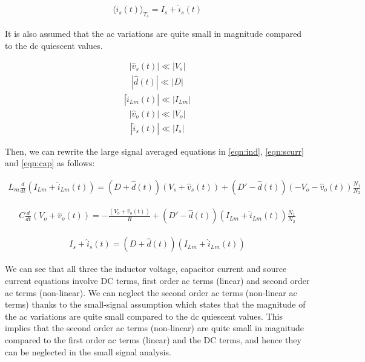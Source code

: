 \begin{align}
     \langle i_s(t) \rangle_{T_s} = I_s + \hat{i}_s(t)
\end{align}

It is also assumed that the ac variations are quite small in magnitude compared to the dc quiescent values.

\begin{align}
    |\hat{v}_s(t)| \ll |V_s|
\end{align}
\begin{align}
    |\hat{d}(t)| \ll |D|
\end{align}
\begin{align}
    |\hat{i}_{Lm}(t)| \ll |I_{Lm}|
\end{align}
\begin{align}
    |\hat{v}_o(t)| \ll |V_o|
\end{align}
\begin{align}
    |\hat{i}_s(t)| \ll |I_s|
\end{align}

Then, we can rewrite the large signal averaged equations in \eqref{eqn:ind}, \eqref{eqn:scurr} and \eqref{eqn:cap} as follows:

\begin{align}
    L_m\frac{d}{dt}(I_{Lm}+\hat{i}_{Lm}(t)) = (D+\hat{d}(t))(V_s+\hat{v}_s(t)) + (D'-\hat{d}(t))(-V_o-\hat{v}_o(t))\frac{N_1}{N_2}
\end{align}

\begin{align}
    C\frac{d}{dt}(V_o+\hat{v}_o(t)) = -\frac{(V_o+\hat{v}_o(t))}{R} + (D'-\hat{d}(t))(I_{Lm}+\hat{i}_{Lm}(t))\frac{N_1}{N_2}
\end{align}

\begin{align}
    I_s + \hat{i}_s(t) = (D+\hat{d}(t))(I_{Lm}+\hat{i}_{Lm}(t))
\end{align}

We can see that all three the inductor voltage, capacitor current and source current equations involve DC terms, first order ac terms (linear) and second order ac terms (non-linear). We can neglect the second order ac terms (non-linear ac terms) thanks to the small-signal assumption which states that the magnitude of the ac variations are quite small compared to the dc quiescent values. This implies that the second order ac terms (non-linear) are quite small in magnitude compared to the first order ac terms (linear) and the DC terms, and hence they can be neglected in the small signal analysis.

